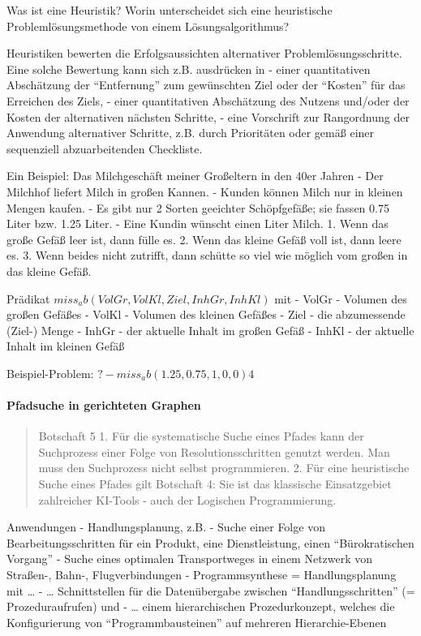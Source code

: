 \documentclass[a4paper]{article}
\begin{document}
\begin{multicols}{3}
  Was ist eine Heuristik? Worin unterscheidet sich eine heuristische
  Problemlösungsmethode von einem Lösungsalgorithmus?

  Heuristiken bewerten die Erfolgsaussichten alternativer
  Problemlösungsschritte. Eine solche Bewertung kann sich z.B. ausdrücken
  in - einer quantitativen Abschätzung der ``Entfernung'' zum gewünschten
  Ziel oder der ``Kosten'' für das Erreichen des Ziels, - einer
  quantitativen Abschätzung des Nutzens und/oder der Kosten der
  alternativen nächsten Schritte, - eine Vorschrift zur Rangordnung der
  Anwendung alternativer Schritte, z.B. durch Prioritäten oder gemäß einer
  sequenziell abzuarbeitenden Checkliste.

  Ein Beispiel: Das Milchgeschäft meiner Großeltern in den 40er Jahren -
  Der Milchhof liefert Milch in großen Kannen. - Kunden können Milch nur
  in kleinen Mengen kaufen. - Es gibt nur 2 Sorten geeichter Schöpfgefäße;
  sie fassen 0.75 Liter bzw. 1.25 Liter. - Eine Kundin wünscht einen Liter
  Milch. 1. Wenn das große Gefäß leer ist, dann fülle es. 2. Wenn das
  kleine Gefäß voll ist, dann leere es. 3. Wenn beides nicht zutrifft,
  dann schütte so viel wie möglich vom großen in das kleine Gefäß.

  Prädikat $miss_ab(VolGr, VolKl, Ziel, InhGr, InhKl)$ mit - VolGr -
  Volumen des großen Gefäßes - VolKl - Volumen des kleinen Gefäßes - Ziel
  - die abzumessende (Ziel-) Menge - InhGr - der aktuelle Inhalt im großen
  Gefäß - InhKl - der aktuelle Inhalt im kleinen Gefäß

  Beispiel-Problem: $?- miss_ab( 1.25 , 0.75 , 1 , 0 , 0 )4$

  \paragraph{Pfadsuche in gerichteten
    Graphen}\label{pfadsuche-in-gerichteten-graphen}

  \begin{quote}
    Botschaft 5 1. Für die systematische Suche eines Pfades kann der
    Suchprozess einer Folge von Resolutionsschritten genutzt werden. Man
    muss den Suchprozess nicht selbst programmieren. 2. Für eine
    heuristische Suche eines Pfades gilt Botschaft 4: Sie ist das klassische
    Einsatzgebiet zahlreicher KI-Tools - auch der Logischen Programmierung.
  \end{quote}

  Anwendungen - Handlungsplanung, z.B. - Suche einer Folge von
  Bearbeitungsschritten für ein Produkt, eine Dienstleistung, einen
  ``Bürokratischen Vorgang'' - Suche eines optimalen Transportweges in
  einem Netzwerk von Straßen-, Bahn-, Flugverbindungen - Programmsynthese
  = Handlungsplanung mit \ldots{} - \ldots{} Schnittstellen für die
  Datenübergabe zwischen ``Handlungsschritten'' (= Prozeduraufrufen) und -
  \ldots{} einem hierarchischen Prozedurkonzept, welches die
  Konfigurierung von ``Programmbausteinen'' auf mehreren Hierarchie-Ebenen


\end{multicols}
\end{document}
